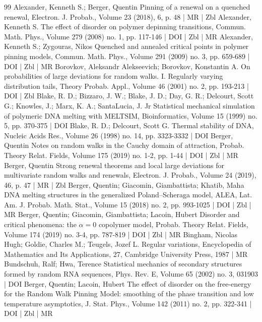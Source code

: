 \documentclass[10pt]{amsart}
\theoremstyle{definition}\newtheorem{defi}[theo]{Definition}\newtheorem{rema}[theo]{Remark}\newtheorem{exam}[theo]{Example}\newtheorem{exem}[theo]{Example}\newtheorem{nota}[theo]{Notation}
\begin{document}
\begin{thebibliography}{99}
Alexander, Kenneth S.; Berger, Quentin Pinning of a renewal on a quenched renewal, Electron. J. Probab., Volume 23 (2018), 6, p. 48 | MR | Zbl
Alexander, Kenneth S. The effect of disorder on polymer depinning transitions, Commun. Math. Phys., Volume 279 (2008) no. 1, pp. 117-146 | DOI | Zbl | MR
Alexander, Kenneth S.; Zygouras, Nikos Quenched and annealed critical points in polymer pinning models, Commun. Math. Phys., Volume 291 (2009) no. 3, pp. 659-689 | DOI | Zbl | MR
Borovkov, Aleksandr Alekseevich; Borovkov, Konstantin A. On probabilities of large deviations for random walks. I. Regularly varying distribution tails, Theory Probab. Appl., Volume 46 (2001) no. 2, pp. 193-213 | DOI | Zbl
Blake, R. D.; Bizzaro, J. W.; Blake, J. D.; Day, G. R.; Delcourt, Scott G.; Knowles, J.; Marx, K. A.; SantaLucia, J. Jr Statistical mechanical simulation of polymeric DNA melting with MELTSIM, Bioinformatics, Volume 15 (1999) no. 5, pp. 370-375 | DOI
Blake, R. D.; Delcourt, Scott G. Thermal stability of DNA, Nucleic Acids Res., Volume 26 (1998) no. 14, pp. 3323-3332 | DOI
Berger, Quentin Notes on random walks in the Cauchy domain of attraction, Probab. Theory Relat. Fields, Volume 175 (2019) no. 1-2, pp. 1-44 | DOI | Zbl | MR
Berger, Quentin Strong renewal theorems and local large deviations for multivariate random walks and renewals, Electron. J. Probab., Volume 24 (2019), 46, p. 47 | MR | Zbl
Berger, Quentin; Giacomin, Giambattista; Khatib, Maha DNA melting structures in the generalized Poland–Scheraga model, ALEA, Lat. Am. J. Probab. Math. Stat., Volume 15 (2018) no. 2, pp. 993-1025 | DOI | Zbl | MR
Berger, Quentin; Giacomin, Giambattista; Lacoin, Hubert Disorder and critical phenomena: the $\alpha =0$ copolymer model, Probab. Theory Relat. Fields, Volume 174 (2019) no. 3-4, pp. 787-819 | DOI | Zbl | MR
Bingham, Nicolas Hugh; Goldie, Charles M.; Teugels, Jozef L. Regular variations, Encyclopedia of Mathematics and Its Applications, 27, Cambridge University Press, 1987 | MR
Bundschuh, Ralf; Hwa, Terence Statistical mechanics of secondary structures formed by random RNA sequences, Phys. Rev. E, Volume 65 (2002) no. 3, 031903 | DOI
Berger, Quentin; Lacoin, Hubert The effect of disorder on the free-energy for the Random Walk Pinning Model: smoothing of the phase transition and low temperature asymptotics, J. Stat. Phys., Volume 142 (2011) no. 2, pp. 322-341 | DOI | Zbl | MR

\end{thebibliography}
\end{document}
